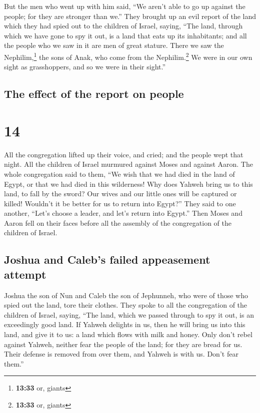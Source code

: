  But the men who went up with him said, ``We aren't able
to go up against the people; for they are stronger than we.''
 They brought up an evil report of the land which they
had spied out to the children of Israel, saying, ``The land, through
which we have gone to spy it out, is a land that eats up its
inhabitants; and all the people who we saw in it are men of great
stature.  There we saw the Nephilim,\footnote{\textbf{13:33}
  or, giants} the sons of Anak, who come from the Nephilim.\footnote{\textbf{13:33}
  or, giants} We were in our own sight as grasshoppers, and so we were
in their sight.''

\hypertarget{the-effect-of-the-report-on-people}{%
\subsection{The effect of the report on
people}\label{the-effect-of-the-report-on-people}}

\hypertarget{section-13}{%
\section{14}\label{section-13}}

 All the congregation lifted up their voice, and cried;
and the people wept that night.  All the children of
Israel murmured against Moses and against Aaron. The whole congregation
said to them, ``We wish that we had died in the land of Egypt, or that
we had died in this wilderness!  Why does Yahweh bring us
to this land, to fall by the sword? Our wives and our little ones will
be captured or killed! Wouldn't it be better for us to return into
Egypt?''  They said to one another, ``Let's choose a
leader, and let's return into Egypt.''  Then Moses and
Aaron fell on their faces before all the assembly of the congregation of
the children of Israel.

\hypertarget{joshua-and-calebs-failed-appeasement-attempt}{%
\subsection{Joshua and Caleb's failed appeasement
attempt}\label{joshua-and-calebs-failed-appeasement-attempt}}

 Joshua the son of Nun and Caleb the son of Jephunneh, who
were of those who spied out the land, tore their clothes. 
They spoke to all the congregation of the children of Israel, saying,
``The land, which we passed through to spy it out, is an exceedingly
good land.  If Yahweh delights in us, then he will bring
us into this land, and give it to us: a land which flows with milk and
honey.  Only don't rebel against Yahweh, neither fear the
people of the land; for they are bread for us. Their defense is removed
from over them, and Yahweh is with us. Don't fear them.''

